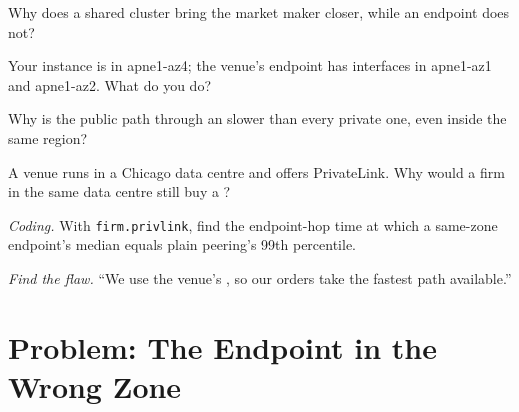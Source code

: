 \begin{exercise}[$\star$]\label{exo:nw:private-connectivity-to-crypto-venues:3}
Why does a shared cluster  bring the market maker closer, while an endpoint does not?
\end{exercise}

\begin{exercise}[$\star\star$]\label{exo:nw:private-connectivity-to-crypto-venues:4}
Your instance is in apne1-az4; the venue's endpoint has interfaces in apne1-az1 and apne1-az2. What do you do?
\end{exercise}

\begin{exercise}[$\star\star$]\label{exo:nw:private-connectivity-to-crypto-venues:5}
Why is the public path through an  slower than every private one, even inside the same region?
\end{exercise}

\begin{exercise}[$\star\star$]\label{exo:nw:private-connectivity-to-crypto-venues:6}
A venue runs in a Chicago data centre and offers PrivateLink. Why would a firm in the same data centre still buy a ?
\end{exercise}

\begin{exercise}[$\star\star\star$]\label{exo:nw:private-connectivity-to-crypto-venues:7}
\emph{Coding.} With \texttt{firm.privlink}, find the endpoint-hop time at which a same-zone endpoint's median equals plain peering's 99th percentile.
\end{exercise}

\begin{exercise}[$\star\star\star$]\label{exo:nw:private-connectivity-to-crypto-venues:8}
\emph{Find the flaw.} ``We use the venue's , so our orders take the fastest path available.''
\end{exercise}

\section{Problem: The Endpoint in the Wrong Zone}

